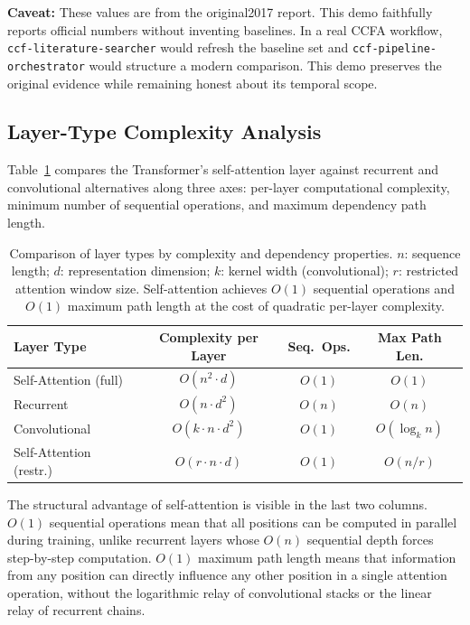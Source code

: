 ﻿\documentclass{article}
\begin{document}
\textbf{Caveat:} These values are from the original2017 report. This demo faithfully reports official numbers without inventing baselines. In a real CCFA workflow, \texttt{ccf-literature-searcher} would refresh the baseline set and \texttt{ccf-pipeline-orchestrator} would structure a modern comparison. This demo preserves the original evidence while remaining honest about its temporal scope.

\subsection{Layer-Type Complexity Analysis}

Table~\ref{tab:complexity} compares the Transformer's self-attention layer against recurrent and convolutional alternatives along three axes: per-layer computational complexity, minimum number of sequential operations, and maximum dependency path length.

\begin{table}[t]
 \centering
 \caption{Comparison of layer types by complexity and dependency properties. $n$: sequence length; $d$: representation dimension; $k$: kernel width (convolutional); $r$: restricted attention window size. Self-attention achieves $O(1)$ sequential operations and $O(1)$ maximum path length at the cost of quadratic per-layer complexity.}
 \label{tab:complexity}
 \small
 \begin{tabular}{l c c c}
 \toprule
 Layer Type & Complexity per Layer & Seq.\ Ops. & Max Path Len. \\
 \midrule
 Self-Attention (full) & $O(n^2 \cdot d)$ & $O(1)$ & $O(1)$ \\
 Recurrent & $O(n \cdot d^2)$ & $O(n)$ & $O(n)$ \\
 Convolutional & $O(k \cdot n \cdot d^2)$ & $O(1)$ & $O(\log_k n)$ \\
 Self-Attention (restr.)& $O(r \cdot n \cdot d)$ & $O(1)$ & $O(n/r)$ \\
 \bottomrule
 \end{tabular}
\end{table}

The structural advantage of self-attention is visible in the last two columns. $O(1)$ sequential operations mean that all positions can be computed in parallel during training, unlike recurrent layers whose $O(n)$ sequential depth forces step-by-step computation. $O(1)$ maximum path length means that information from any position can directly influence any other position in a single attention operation, without the logarithmic relay of convolutional stacks or the linear relay of recurrent chains.
\end{document}
